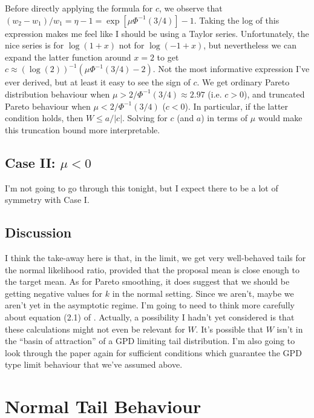 \documentclass{article}
\begin{document}
Before directly applying the formula for $c$, we observe that $(w_2 - w_1)/w_1 = \eta - 1 = \exp[\mu \Phi^{-1}(3/4)] - 1$. Taking the log of this expression makes me feel like I should be using a Taylor series. Unfortunately, the nice series is for $\log(1+x)$ not for $\log(-1 + x)$, but nevertheless we can expand the latter function around $x=2$ to get $c \approx (\log(2))^{-1} (\mu \Phi^{-1}(3/4) - 2)$. Not the most informative expression I've ever derived, but at least it easy to see the sign of $c$. We get ordinary Pareto distribution behaviour when $\mu > 2 / \Phi^{-1}(3/4) \approx 2.97$ (i.e. $c>0$), and truncated Pareto behaviour when $\mu < 2 / \Phi^{-1}(3/4)$ ($c<0$). In particular, if the latter condition holds, then $W \leq a / |c|$. Solving for $c$ (and $a$) in terms of $\mu$ would make this truncation bound more interpretable.



\subsection{Case II: $\mu < 0$}

I'm not going to go through this tonight, but I expect there to be a lot of symmetry with Case I.


\subsection{Discussion}

I think the take-away here is that, in the limit, we get very well-behaved tails for the normal likelihood ratio, provided that the proposal mean is close enough to the target mean. As for Pareto smoothing, it does suggest that we should be getting negative values for $k$ in the normal setting. Since we aren't, maybe we aren't yet in the asymptotic regime. I'm going to need to think more carefully about equation (2.1) of \citet{Pic75}. Actually, a possibility I hadn't yet considered is that these calculations might not even be relevant for $W$. It's possible that $W$ isn't in the ``basin of attraction'' of a GPD limiting tail distribution. I'm also going to look through the paper again for sufficient conditions which guarantee the GPD type limit behaviour that we've assumed above.


\section{Normal Tail Behaviour}
\label{sec:norm_tail}
\end{document}
